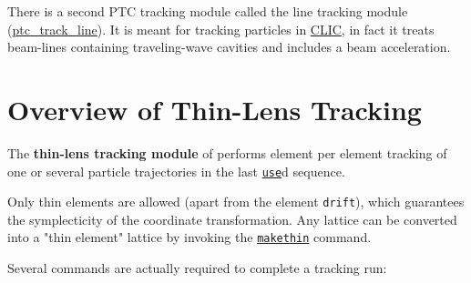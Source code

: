 There is a second PTC tracking module called the line tracking module
(\href{../ptc_track_line/ptc_track_line.html}{ptc\_track\_line}). It is
meant for tracking particles in
\href{http://clic-study.web.cern.ch/CLIC-Study/}{CLIC}, in fact it
treats beam-lines containing traveling-wave cavities and includes a beam
acceleration. 






\section{Overview of Thin-Lens Tracking} %
\label{sec:trackoverview}

The \textbf{thin-lens tracking module} of \madx performs element per
element tracking of one or several particle trajectories in the last
\href{../control/general.html#use}{\texttt{use}}d sequence.  
 

Only thin elements are allowed (apart from the element \texttt{drift}),
which guarantees the symplecticity of the coordinate transformation. Any
lattice can be converted into a "thin element" lattice by invoking the
\href{../makethin/makethin.html}{\texttt{makethin}} command. 

Several commands are actually required to complete a tracking run:



